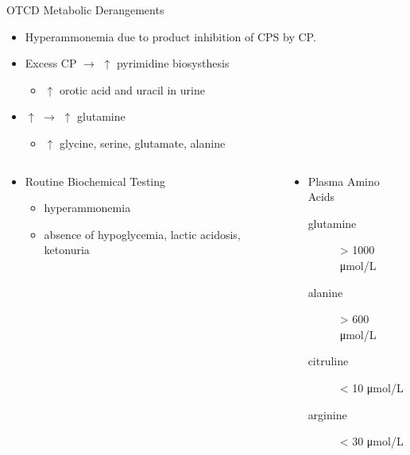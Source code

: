 \documentclass[presentation, smaller]{beamer}
\begin{document}
\begin{frame}[label={sec:orgheadline8}]{OTCD Metabolic Derangements}
\begin{itemize}
\item Hyperammonemia due to product inhibition of CPS by CP.
\item Excess CP \(\to\) \(\uparrow\) pyrimidine biosysthesis
\begin{itemize}
\item \(\uparrow\) orotic acid and uracil in urine
\end{itemize}
\item \(\uparrow\)  \(\to\) \(\uparrow\) glutamine
\begin{itemize}
\item \(\uparrow\)  glycine, serine, glutamate, alanine
\end{itemize}
\end{itemize}

\begin{columns}
\begin{column}{0.5\columnwidth}
\begin{itemize}
\item Routine Biochemical Testing
\begin{itemize}
\item hyperammonemia
\item absence of hypoglycemia, lactic acidosis, ketonuria
\end{itemize}
\end{itemize}
\end{column}

\begin{column}{0.5\columnwidth}
\begin{itemize}
\item Plasma Amino Acids
\begin{description}
\item[{glutamine}] \textgreater{} 1000 \si{\micro\mol/\liter}
\item[{alanine}] \textgreater{} 600 \si{\micro\mol/\liter}
\item[{citruline}] \textless{} 10 \si{\micro\mol/\liter}
\item[{arginine}] \textless{} 30 \si{\micro\mol/\liter}
\end{description}
\end{itemize}
\end{column}
\end{columns}
\end{frame}
\end{document}
